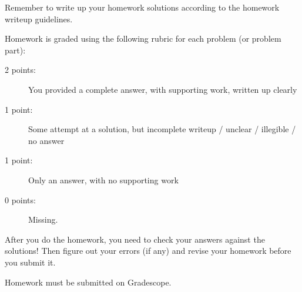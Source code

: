 \documentclass[11pt, oneside]{article}   	%
\begin{document}
Remember to write up your homework solutions according to the homework writeup guidelines. 

Homework is graded using the following rubric for each problem (or problem part):

\begin{description}
\item[2 points:] You provided a complete answer, with supporting work, written up clearly
\item[1 point:] Some attempt at a solution, but incomplete writeup / unclear / illegible / no answer
\item[1 point:] Only an answer, with no supporting work 
\item[0 points:] Missing.
\end{description}

After you do the homework, you need to check your answers against the solutions! Then figure out your errors (if any) and revise your homework before you submit it. 

Homework must be submitted on Gradescope.
\end{document}
